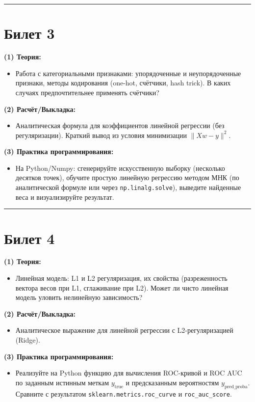 \documentclass[a4paper,12pt]{article}
\begin{document}
\noindent\rule{\textwidth}{0.4pt}
\newpage

\section*{Билет 3}
\textbf{(1) Теория:}
\begin{itemize}
  \item Работа с категориальными признаками: упорядоченные и неупорядоченные признаки, методы кодирования (one-hot, счётчики, hash trick). В каких случаях предпочтительнее применять счётчики?
\end{itemize}

\textbf{(2) Расчёт/Выкладка:}
\begin{itemize}
  \item Аналитическая формула для коэффициентов линейной регрессии (без регуляризации). Краткий вывод из условия минимизации $\|Xw - y\|^2$.
\end{itemize}

\textbf{(3) Практика программирования:}
\begin{itemize}
  \item На Python/Numpy: сгенерируйте искусственную выборку (несколько десятков точек), обучите простую линейную регрессию методом МНК (по аналитической формуле или через \texttt{np.linalg.solve}), выведите найденные веса и визуализируйте результат.
\end{itemize}

\noindent\rule{\textwidth}{0.4pt}

\section*{Билет 4}
\textbf{(1) Теория:}
\begin{itemize}
  \item Линейная модель: L1 и L2 регуляризация, их свойства (разреженность вектора весов при L1, сглаживание при L2). Может ли чисто линейная модель уловить нелинейную зависимость?
\end{itemize}

\textbf{(2) Расчёт/Выкладка:}
\begin{itemize}
  \item Аналитическое выражение для линейной регрессии с L2-регуляризацией (Ridge).
\end{itemize}

\textbf{(3) Практика программирования:}
\begin{itemize}
  \item Реализуйте на Python функцию для вычисления ROC-кривой и ROC AUC по заданным истинным меткам $y_{\text{true}}$ и предсказанным вероятностям $y_{\text{pred\_proba}}$. Сравните с результатом \texttt{sklearn.metrics.roc\_curve} и \texttt{roc\_auc\_score}.
\end{itemize}
\end{document}
